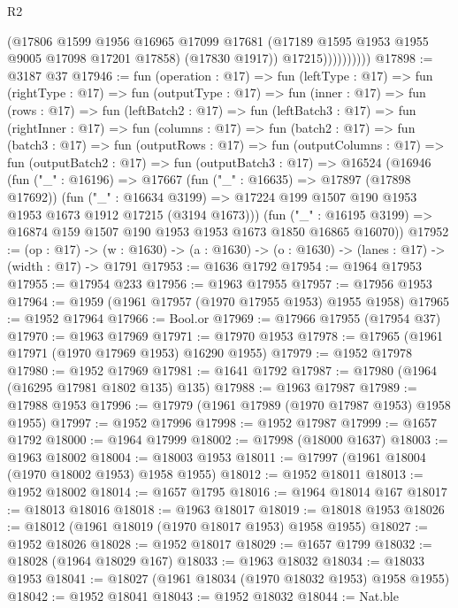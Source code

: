 \begin{lexlean}{R2}
\begin{coremodule}
                        (@17806
                          @1599
                          @1956
                          @16965
                          @17099
                          @17681
                          (@17189 @1595 @1953 @1955 @9005 @17098 @17201 @17858)
                          (@17830 @1917))
                        @17215))))))))))
@17898 := @3187 @37
@17946 := fun (operation : @17) =>
  fun (leftType : @17) =>
  fun (rightType : @17) =>
  fun (outputType : @17) =>
  fun (inner : @17) =>
  fun (rows : @17) =>
  fun (leftBatch2 : @17) =>
  fun (leftBatch3 : @17) =>
  fun (rightInner : @17) =>
  fun (columns : @17) =>
  fun (batch2 : @17) =>
  fun (batch3 : @17) =>
  fun (outputRows : @17) =>
  fun (outputColumns : @17) =>
  fun (outputBatch2 : @17) =>
  fun (outputBatch3 : @17) =>
  @16524
    (@16946
      (fun ("_" : @16196) =>
      @17667
        (fun ("_" : @16635) => @17897 (@17898 @17692))
        (fun ("_" : @16634 @3199) =>
        @17224 @199 @1507 @190 @1953 @1953 @1673 @1912 @17215 (@3194 @1673)))
      (fun ("_" : @16195 @3199) => @16874 @159 @1507 @190 @1953 @1953 @1673 @1850 @16865 @16070))
@17952 := (op : @17) ->
  (w : @1630) -> (a : @1630) -> (o : @1630) -> (lanes : @17) -> (width : @17) -> @1791
@17953 := @1636 @1792
@17954 := @1964 @17953
@17955 := @17954 @233
@17956 := @1963 @17955
@17957 := @17956 @1953
@17964 := @1959 (@1961 @17957 (@1970 @17955 @1953) @1955 @1958)
@17965 := @1952 @17964
@17966 := Bool.or
@17969 := @17966 @17955 (@17954 @37)
@17970 := @1963 @17969
@17971 := @17970 @1953
@17978 := @17965 (@1961 @17971 (@1970 @17969 @1953) @16290 @1955)
@17979 := @1952 @17978
@17980 := @1952 @17969
@17981 := @1641 @1792
@17987 := @17980 (@1964 (@16295 @17981 @1802 @135) @135)
@17988 := @1963 @17987
@17989 := @17988 @1953
@17996 := @17979 (@1961 @17989 (@1970 @17987 @1953) @1958 @1955)
@17997 := @1952 @17996
@17998 := @1952 @17987
@17999 := @1657 @1792
@18000 := @1964 @17999
@18002 := @17998 (@18000 @1637)
@18003 := @1963 @18002
@18004 := @18003 @1953
@18011 := @17997 (@1961 @18004 (@1970 @18002 @1953) @1958 @1955)
@18012 := @1952 @18011
@18013 := @1952 @18002
@18014 := @1657 @1795
@18016 := @1964 @18014 @167
@18017 := @18013 @18016
@18018 := @1963 @18017
@18019 := @18018 @1953
@18026 := @18012 (@1961 @18019 (@1970 @18017 @1953) @1958 @1955)
@18027 := @1952 @18026
@18028 := @1952 @18017
@18029 := @1657 @1799
@18032 := @18028 (@1964 @18029 @167)
@18033 := @1963 @18032
@18034 := @18033 @1953
@18041 := @18027 (@1961 @18034 (@1970 @18032 @1953) @1958 @1955)
@18042 := @1952 @18041
@18043 := @1952 @18032
@18044 := Nat.ble

\end{coremodule}
\end{lexlean}
